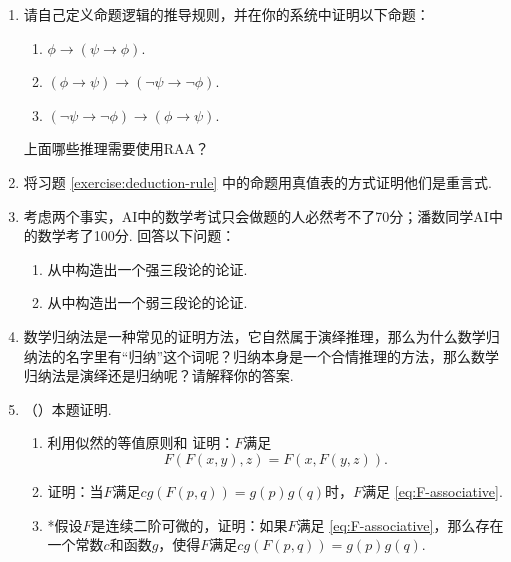 \begin{enumerate}[wide, labelindent=0pt]
    \item \label{exercise:deduction-rule} 请自己定义命题逻辑的推导规则，并在你的系统中证明以下命题：
    \begin{enumerate}
        \item $\phi\to(\psi\to\phi)$.
        \item $(\phi\to\psi)\to(\neg\psi\to\neg\phi)$.
        \item $(\neg\psi\to\neg\phi)\to(\phi\to\psi)$.
    \end{enumerate}
    上面哪些推理需要使用RAA？

    \item 将习题 \ref{exercise:deduction-rule} 中的命题用真值表的方式证明他们是重言式.
    
    \item 考虑两个事实，AI中的数学考试只会做题的人必然考不了70分；潘数同学AI中的数学考了100分. 回答以下问题：
    \begin{enumerate}
        \item 从中构造出一个强三段论的论证.
        \item 从中构造出一个弱三段论的论证. 
    \end{enumerate}

    \item 数学归纳法是一种常见的证明方法，它自然属于演绎推理，那么为什么数学归纳法的名字里有“归纳”这个词呢？归纳本身是一个合情推理的方法，那么数学归纳法是演绎还是归纳呢？请解释你的答案.
    
    \item \label{exercise:derive-F} （\cite{coxProbabilityFrequencyReasonable1946}）本题证明. 
    \begin{enumerate}
        \item 利用似然的等值原则和 证明：$F$满足
        \begin{equation}
            F(F(x,y),z)=F(x,F(y,z)). \label{eq:F-associative}
        \end{equation}
        \item 证明：当$F$满足$cg(F(p,q))=g(p)g(q)$时，$F$满足 \eqref{eq:F-associative}.
        \item *假设$F$是连续二阶可微的，证明：如果$F$满足 \eqref{eq:F-associative}，那么存在一个常数$c$和函数$g$，使得$F$满足$cg(F(p,q))=g(p)g(q)$.
    \end{enumerate}
    

\end{enumerate}
